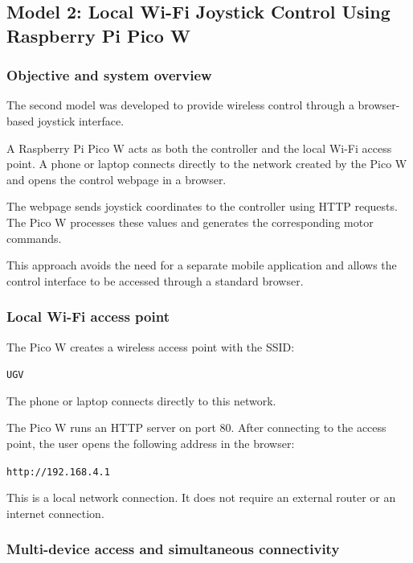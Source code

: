 \documentclass[11pt,a4paper]{article}
\begin{document}
\subsection{Model 2: Local Wi-Fi Joystick Control Using Raspberry Pi Pico W}
\label{model:wifi}

\subsubsection{Objective and system overview}

The second model was developed to provide wireless
control through a browser-based joystick interface.

A Raspberry Pi Pico W acts as both the controller
and the local Wi-Fi access point. A phone or laptop
connects directly to the network created by the
Pico W and opens the control webpage in a browser.

The webpage sends joystick coordinates to the
controller using HTTP requests. The Pico W processes
these values and generates the corresponding
motor commands.

This approach avoids the need for a separate
mobile application and allows the control interface
to be accessed through a standard browser.


\subsubsection{Local Wi-Fi access point}

The Pico W creates a wireless access point with
the SSID:

\begin{center}
    \texttt{UGV}
\end{center}

The phone or laptop connects directly to this
network.

The Pico W runs an HTTP server on port 80.
After connecting to the access point, the user
opens the following address in the browser:

\begin{center}
    \texttt{http://192.168.4.1}
\end{center}

This is a local network connection. It does not
require an external router or an internet connection.


\subsubsection{Multi-device access and simultaneous connectivity}
\end{document}

